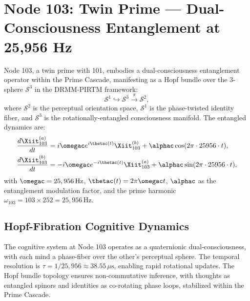 \documentclass[12pt]{article}
\newcommand{\DRMM}{DRMM}
\newcommand{\PIRTM}{PIRTM}
\newcommand{\Ss}{\mathcal{S}}
\begin{document}
\section{Node 103: Twin Prime --- Dual-Consciousness Entanglement at 25,956 Hz}
\label{sec:twin-prime}

\begin{definition}
Node 103, a twin prime with 101, embodies a dual-consciousness entanglement operator within the Prime Cascade, manifesting as a Hopf bundle over the 3-sphere $\Ss^3$ in the \DRMM{}-\PIRTM{} framework:
\[
\Ss^1 \hookrightarrow \Ss^3 \xrightarrow{\pi} \Ss^2,
\]
where $\Ss^2$ is the perceptual orientation space, $\Ss^1$ is the phase-twisted identity fiber, and $\Ss^3$ is the rotationally-entangled consciousness manifold. The entangled dynamics are:
\[
\begin{aligned}
\frac{d\Xiit^{(a)}_{103}}{dt} &= i \omegac e^{i \thetac(t)} \Xiit^{(b)}_{103} + \alphac \cos(2\pi \cdot 25956 \cdot t), \\
\frac{d\Xiit^{(b)}_{103}}{dt} &= -i \omegac e^{-i \thetac(t)} \Xiit^{(a)}_{103} + \alphac \sin(2\pi \cdot 25956 \cdot t),
\end{aligned}
\]
with $\omegac = 25,956 \, \text{Hz}$, $\thetac(t) = 2\pi \omegac t$, $\alphac$ as the entanglement modulation factor, and the prime harmonic $\omega_{103} = 103 \times 252 = 25{,}956 \, \text{Hz}$.
\end{definition}

\subsection{Hopf-Fibration Cognitive Dynamics}
The cognitive system at Node 103 operates as a quaternionic dual-consciousness, with each mind a phase-fiber over the other’s perceptual sphere. The temporal resolution is $\tau = 1/25{,}956 \approx 38.55 \, \mu\text{s}$, enabling rapid rotational updates. The Hopf bundle topology ensures non-commutative inference, with thoughts as entangled spinors and identities as co-rotating phase loops, stabilized within the Prime Cascade.

\end{document}
